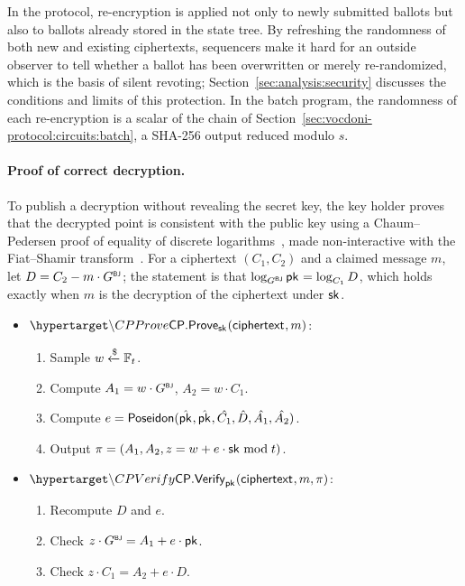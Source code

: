 In the protocol, re-encryption is applied not only to newly submitted ballots but also to ballots already stored in the state tree. By refreshing the randomness of both new and existing ciphertexts, sequencers make it hard for an outside observer to tell whether a ballot has been overwritten or merely re-randomized, which is the basis of silent revoting; Section~\ref{sec:analysis:security} discusses the conditions and limits of this protection. In the batch program, the randomness of each re-encryption is a scalar of the chain of Section~\ref{sec:vocdoni-protocol:circuits:batch}, a SHA-256 output reduced modulo $s$.

\paragraph{Proof of correct decryption.} To publish a decryption without revealing the secret key, the key holder proves that the decrypted point is consistent with the public key using a Chaum--Pedersen proof of equality of discrete logarithms~\cite{chaum1992wallet}, made non-interactive with the Fiat--Shamir transform~\cite{fiat1986prove}. For a ciphertext $(C_1, C_2)$ and a claimed message $m$, let $D = C_2 - m \cdot {G}^{\text{\tiny \sf BJ}}$; the statement is that $\log_{{G}^{\text{\tiny \sf BJ}}} {\sf{pk}^{}} = \log_{C_1} D$, which holds exactly when $m$ is the decryption of the ciphertext under ${\sf{sk}^{}}$.
\begin{mdframed}
	\begin{minipage}[t]{0.52\textwidth}
		\begin{itemize}
			\item[$\bullet$] $\hlset{\CPProve}_{\sk}(\enc, m)$:
			\begin{enumerate}
				\item Sample $w \xleftarrow{\$} \mathbb{F}_t$.
				\item Compute $A_1 = w \cdot {G}^{\text{\tiny \sf BJ}}$, $A_2 = w \cdot C_1$.
				\item Compute $e = {\sf{Poseidon}}(\hat{{\sf{pk}^{}}}, \hat{{\sf{pk}^{}}}, \hat{C_1}, \hat{D}, \hat{A_1}, \hat{A_2})$.
				\item Output $\pi = (A_1, A_2, z = w + e \cdot {\sf{sk}^{}} \bmod t)$.
			\end{enumerate}
		\end{itemize}
	\end{minipage}
	\begin{minipage}[t]{0.46\textwidth}
		\begin{itemize}
			\item[$\bullet$] $\hlset{\CPVerify}_{\pk}(\enc, m, \pi)$:
			\begin{enumerate}
				\item Recompute $D$ and $e$.
				\item Check $z \cdot {G}^{\text{\tiny \sf BJ}} = A_1 + e \cdot {\sf{pk}^{}}$.
				\item Check $z \cdot C_1 = A_2 + e \cdot D$.
			\end{enumerate}
		\end{itemize}
	\end{minipage}
\end{mdframed}
